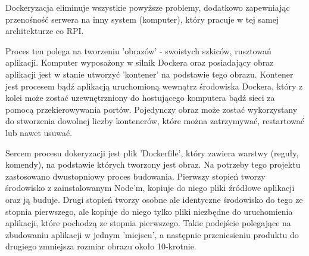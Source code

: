 Dockeryzacja eliminuje wszystkie powyższe problemy, dodatkowo zapewniając przenośność serwera na inny system (komputer), który pracuje w tej samej architekturze co RPI.

Proces ten polega na tworzeniu 'obrazów' - swoistych szkiców, rusztowań aplikacji. Komputer wyposażony w silnik Dockera oraz posiadający obraz aplikacji jest w stanie 
utworzyć 'kontener' na podstawie tego obrazu. Kontener jest procesem bądź aplikacją uruchomioną wewnątrz środowiska Dockera, który z kolei może zostać uzewnętrzniony do 
hostującego komputera bądź sieci za pomocą przekierowywania portów. Pojedynczy obraz może zostać wykorzystany do stworzenia dowolnej liczby kontenerów, które
można zatrzymywać, restartować lub nawet usuwać.

Sercem procesu dokeryzacji jest plik 'Dockerfile', który zawiera warstwy (reguły, komendy), na podstawie których tworzony jest obraz. Na potrzeby tego projektu zastosowano
dwustopniowy proces budowania. Pierwszy stopień tworzy środowisko z zainstalowanym Node'm, kopiuje do niego pliki źródłowe aplikacji oraz ją buduje. Drugi stopień tworzy osobne
ale identyczne środowisko do tego ze stopnia pierwszego, ale kopiuje do niego tylko pliki niezbędne do uruchomienia aplikacji, które pochodzą ze stopnia pierwszego. 
Takie podejście polegające na zbudowaniu aplikacji w jednym 'miejscu', a następnie przeniesieniu produktu do drugiego zmniejsza rozmiar obrazu około 10-krotnie.

